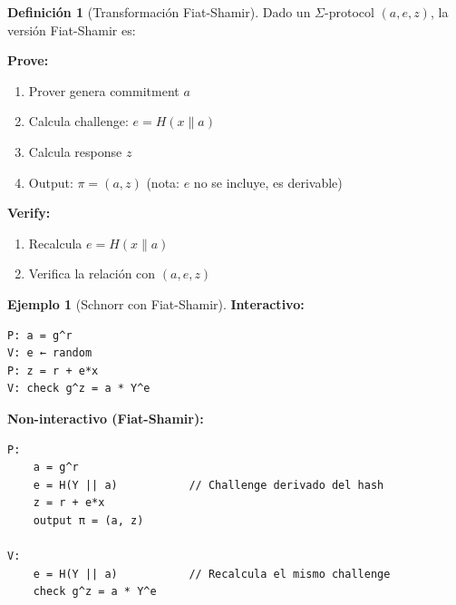 \documentclass[11pt,a4paper,twoside,openright]{book}
\theoremstyle{definition}
\newtheorem{definition}{Definición}[chapter]
\newtheorem{example}{Ejemplo}[chapter]
\theoremstyle{plain}
\theoremstyle{remark}
\begin{document}
\begin{definition}[Transformación Fiat-Shamir]
Dado un $\Sigma$-protocol $(a, e, z)$, la versión Fiat-Shamir es:

\textbf{Prove:}
\begin{enumerate}
    \item Prover genera commitment $a$
    \item Calcula challenge: $e = H(x \| a)$
    \item Calcula response $z$
    \item Output: $\pi = (a, z)$ (nota: $e$ no se incluye, es derivable)
\end{enumerate}

\textbf{Verify:}
\begin{enumerate}
    \item Recalcula $e = H(x \| a)$
    \item Verifica la relación con $(a, e, z)$
\end{enumerate}
\end{definition}

\begin{example}[Schnorr con Fiat-Shamir]
\textbf{Interactivo:}
\begin{verbatim}
P: a = g^r
V: e ← random
P: z = r + e*x
V: check g^z = a * Y^e
\end{verbatim}

\textbf{Non-interactivo (Fiat-Shamir):}
\begin{verbatim}
P: 
    a = g^r
    e = H(Y || a)           // Challenge derivado del hash
    z = r + e*x
    output π = (a, z)

V:
    e = H(Y || a)           // Recalcula el mismo challenge
    check g^z = a * Y^e
\end{verbatim}
\end{example}
\end{document}
